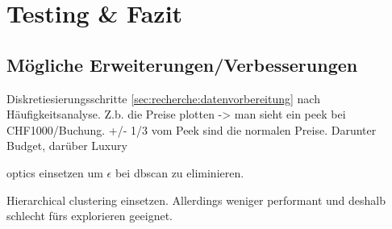 
\chapter{Testing \& Fazit}
\label{sec:testingfazit}

\section{Mögliche Erweiterungen/Verbesserungen}
Diskretiesierungsschritte \cref{sec:recherche:datenvorbereitung} nach Häufigkeitsanalyse.
Z.b. die Preise plotten -> man sieht ein peek bei CHF1000/Buchung. +/- 1/3 vom Peek sind die normalen Preise. Darunter Budget, darüber Luxury

\gls{optics} einsetzen um $\epsilon$ bei \gls{dbscan} zu eliminieren.

Hierarchical clustering einsetzen. Allerdings weniger performant und deshalb schlecht fürs explorieren geeignet.